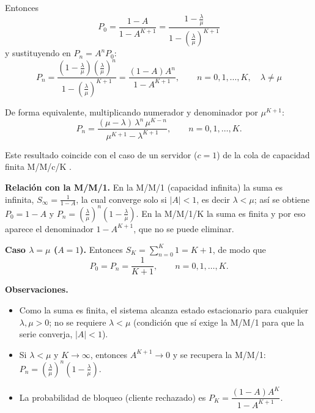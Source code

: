 \documentclass[12pt]{article}
\begin{document}
Entonces
\[
\boxed{P_0=\frac{1-A}{1-A^{K+1}}=\frac{1-\frac{\lambda}{\mu}}{1-\left(\frac{\lambda}{\mu}\right)^{K+1}}}
\]
y sustituyendo en $P_n=A^nP_0$:
\[
\boxed{P_n=\frac{\left(1-\frac{\lambda}{\mu}\right)\left(\frac{\lambda}{\mu}\right)^{n}}{1-\left(\frac{\lambda}{\mu}\right)^{K+1}}=\frac{(1-A)A^n}{1-A^{K+1}},\qquad n=0,1,\dots,K,\quad \lambda\neq\mu}
\]

De forma equivalente, multiplicando numerador y denominador por $\mu^{K+1}$:
\[
P_n=\frac{(\mu-\lambda)\,\lambda^{n}\,\mu^{K-n}}{\mu^{K+1}-\lambda^{K+1}},\qquad n=0,1,\dots,K .
\]

Este resultado coincide con el caso de un servidor ($c=1$) de la cola de capacidad finita M/M/c/K \autocite[cap.~3]{shortle2018}.

\textbf{Relación con la M/M/1.} En la M/M/1 (capacidad infinita) la suma es infinita, $S_\infty=\frac{1}{1-A}$, la cual converge solo si $|A|<1$, es decir $\lambda<\mu$; así se obtiene $P_0=1-A$ y $P_n=\left(\frac{\lambda}{\mu}\right)^n\left(1-\frac{\lambda}{\mu}\right)$. En la M/M/1/K la suma es finita y por eso aparece el denominador $1-A^{K+1}$, que no se puede eliminar.

\textbf{Caso $\lambda=\mu$ ($A=1$).} Entonces $S_K=\sum_{n=0}^{K}1=K+1$, de modo que
\[
P_0=P_n=\frac{1}{K+1},\qquad n=0,1,\dots,K .
\]

\textbf{Observaciones.}
\begin{itemize}
    \item Como la suma es finita, el sistema alcanza estado estacionario para cualquier $\lambda,\mu>0$; no se requiere $\lambda<\mu$ (condición que sí exige la M/M/1 para que la serie converja, $|A|<1$).
    \item Si $\lambda<\mu$ y $K\to\infty$, entonces $A^{K+1}\to 0$ y se recupera la M/M/1: $P_n=\left(\frac{\lambda}{\mu}\right)^n\left(1-\frac{\lambda}{\mu}\right)$.
    \item La probabilidad de bloqueo (cliente rechazado) es $P_K=\dfrac{(1-A)A^K}{1-A^{K+1}}$.
\end{itemize}

\printbibliography
\end{document}
